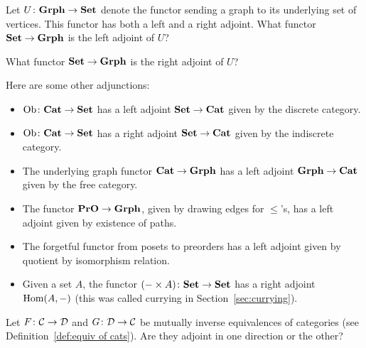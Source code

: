 \documentclass[CT4S-EN-RU]{subfiles}
\begin{document}
\begin{exampleRUS}
\end{exampleRUS}

\begin{exerciseENG}
Let $U\colon{\mathbf{Grph}}\rightarrow{\mathbf{Set}}$ denote the functor sending a graph to its underlying set of vertices. This functor has both a left and a right adjoint. 
\sexc What functor ${\mathbf{Set}}\rightarrow{\mathbf{Grph}}$ is the left adjoint of $U$?
\item What functor ${\mathbf{Set}}\rightarrow{\mathbf{Grph}}$ is the right adjoint of $U$?
\endsexc
\end{exerciseENG}

\begin{exerciseRUS}
\end{exerciseRUS}

\begin{exampleENG}\label{ex:other adjunctions}
Here are some other adjunctions:

\begin{itemize}
\item $\textnormal{Ob}\colon{\mathbf{Cat}}\rightarrow{\mathbf{Set}}$ has a left adjoint ${\mathbf{Set}}\rightarrow{\mathbf{Cat}}$ given by the discrete category.
\item $\textnormal{Ob}\colon{\mathbf{Cat}}\rightarrow{\mathbf{Set}}$ has a right adjoint ${\mathbf{Set}}\rightarrow{\mathbf{Cat}}$ given by the indiscrete category.
\item The underlying graph functor ${\mathbf{Cat}}\rightarrow{\mathbf{Grph}}$ has a left adjoint ${\mathbf{Grph}}\rightarrow{\mathbf{Cat}}$ given by the free category.
\item The functor ${\mathbf{PrO}}\rightarrow{\mathbf{Grph}}$,  given by drawing edges for $\leq$'s, has a left adjoint given by existence of paths.
\item The forgetful functor from posets to preorders has a left adjoint given by quotient by isomorphism relation.
\item Given a set $A$, the functor $(-\times A)\colon{\mathbf{Set}}\rightarrow{\mathbf{Set}}$ has a right adjoint $\textnormal{Hom}(A,-)$ (this was called currying in Section~\ref{sec:currying}). 
\end{itemize}
\end{exampleENG}

\begin{exampleRUS}\label{ex:other adjunctions}
\end{exampleRUS}

\begin{exerciseENG}
Let $F\colon\mathcal{C}\rightarrow\mathcal{D}$ and $G\colon\mathcal{D}\rightarrow\mathcal{C}$ be mutually inverse equivalences of categories (see Definition~\ref{def:equiv of cats}). Are they adjoint in one direction or the other?
\end{exerciseENG}
\end{document}
